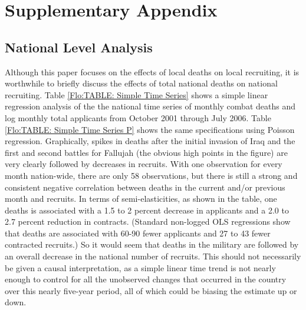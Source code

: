 \documentclass[12pt] {article}
\begin{document}



\appendix

\section{Supplementary Appendix}
\setcounter{table}{0}
\renewcommand{\thetable}{A\arabic{table}}

\setcounter{figure}{0}
\renewcommand{\thefigure}{A\arabic{figure}}


\subsection{National Level Analysis}
Although this paper focuses on the effects of local deaths on local
recruiting, it is worthwhile to briefly discuss the effects of total national
deaths on national recruiting. Table \ref{Flo:TABLE: Simple Time Series}
shows a simple linear regression analysis of the the national time series of monthly combat deaths and log monthly total applicants from October 2001 through July 2006. Table \ref{Flo:TABLE: Simple Time Series P} shows the same specifications using Poisson regression. Graphically, spikes in deaths after the initial invasion of Iraq and the first
and second battles for Fallujah (the obvious high points in the figure)
are very clearly followed by decreases in recruits. With one observation
for every month nation-wide, there are only 58 observations, but there
is still a strong and consistent negative correlation between deaths
in the current and/or previous month and recruits. In terms of semi-elasticities,
as shown in the table, one deaths is associated with a 1.5 to 2 percent decrease in applicants and a 2.0 to 2.7 percent reduction in contracts. (Standard non-logged OLS regressions show
that deaths are associated with 60-90 fewer applicants and 27 to 43
fewer contracted recruits.) So it would seem that deaths in the military
are followed by an overall decrease in the national number of recruits.
This should not necessarily be given a causal interpretation, as a
simple linear time trend is not nearly enough to control for all the
unobserved changes that occurred in the country over this nearly five-year
period, all of which could be biasing the estimate up or down. 
\end{document}
